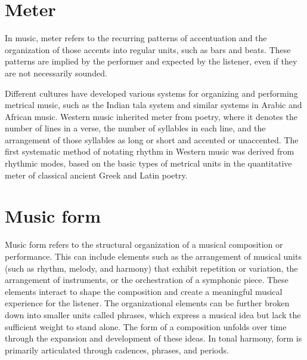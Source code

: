 \section{Meter}

In music, meter refers to the recurring patterns of accentuation and the organization of those accents into regular units, such as bars and beats. These patterns are implied by the performer and expected by the listener, even if they are not necessarily sounded.

Different cultures have developed various systems for organizing and performing metrical music, such as the Indian tala system and similar systems in Arabic and African music. Western music inherited meter from poetry, where it denotes the number of lines in a verse, the number of syllables in each line, and the arrangement of those syllables as long or short and accented or unaccented. The first systematic method of notating rhythm in Western music was derived from rhythmic modes, based on the basic types of metrical units in the quantitative meter of classical ancient Greek and Latin poetry.

\section{Music form}

Music form refers to the structural organization of a musical composition or performance. This can include elements such as the arrangement of musical units (such as rhythm, melody, and harmony) that exhibit repetition or variation, the arrangement of instruments, or the orchestration of a symphonic piece. These elements interact to shape the composition and create a meaningful musical experience for the listener. The organizational elements can be further broken down into smaller units called phrases, which express a musical idea but lack the sufficient weight to stand alone. The form of a composition unfolds over time through the expansion and development of these ideas. In tonal harmony, form is primarily articulated through cadences, phrases, and periods. 